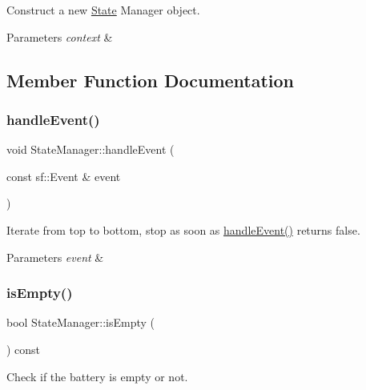 Construct a new \hyperlink{classState}{State} Manager object. 


\begin{DoxyParams}{Parameters}
{\em context} & \\
\hline
\end{DoxyParams}


\subsection{Member Function Documentation}
\mbox{\label{classStateManager_abe6bc824c376c7c5ec22b18b10b3ad92}} 
\subsubsection{\texorpdfstring{handle\+Event()}{handleEvent()}}
{\footnotesize\ttfamily void State\+Manager\+::handle\+Event (\begin{DoxyParamCaption}\item[{const sf\+::\+Event \&}]{event }\end{DoxyParamCaption})}



Iterate from top to bottom, stop as soon as \hyperlink{classStateManager_abe6bc824c376c7c5ec22b18b10b3ad92}{handle\+Event()} returns false. 


\begin{DoxyParams}{Parameters}
{\em event} & \\
\hline
\end{DoxyParams}
\mbox{\label{classStateManager_ad66deb9a952a99c7c9943ebdbb7263d0}} 
\subsubsection{\texorpdfstring{is\+Empty()}{isEmpty()}}
{\footnotesize\ttfamily bool State\+Manager\+::is\+Empty (\begin{DoxyParamCaption}{ }\end{DoxyParamCaption}) const}



Check if the battery is empty or not. 

